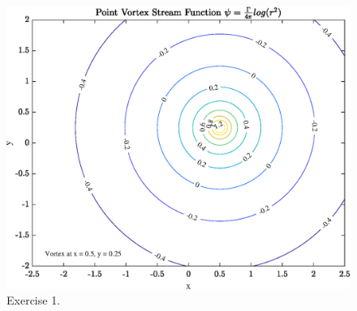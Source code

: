%

%

\begin{figure}[htbp]
\centering
\includegraphics[scale=0.8]{Exercise_1_Contourplot.eps}
\caption{Exercise 1.}
\label{foobar-figure}
\end{figure}